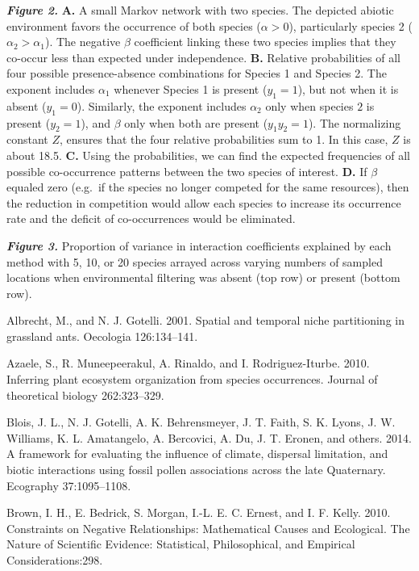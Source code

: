 \documentclass[12pt,]{article}
\begin{document}
\begin{spacing}{1.9}
\begin{flushleft}
\textbf{\emph{Figure 2.}} \textbf{A.} A small Markov network with two
species. The depicted abiotic environment favors the occurrence of both
species (\(\alpha >0\)), particularly species 2
(\(\alpha_2 > \alpha_1\)). The negative \(\beta\) coefficient linking
these two species implies that they co-occur less than expected under
independence. \textbf{B.} Relative probabilities of all four possible
presence-absence combinations for Species 1 and Species 2. The exponent
includes \(\alpha_1\) whenever Species 1 is present (\(y_1 = 1\)), but
not when it is absent (\(y_1 = 0\)). Similarly, the exponent includes
\(\alpha_2\) only when species \(2\) is present (\(y_2 = 1\)), and
\(\beta\) only when both are present (\(y_1y_2 = 1\)). The normalizing
constant \(Z\), ensures that the four relative probabilities sum to 1.
In this case, \(Z\) is about 18.5. \textbf{C.} Using the probabilities,
we can find the expected frequencies of all possible co-occurrence
patterns between the two species of interest. \textbf{D.} If \(\beta\)
equaled zero (e.g.~if the species no longer competed for the same
resources), then the reduction in competition would allow each species
to increase its occurrence rate and the deficit of co-occurrences would
be eliminated.

\textbf{\emph{Figure 3.}} Proportion of variance in interaction
coefficients explained by each method with 5, 10, or 20 species arrayed
across varying numbers of sampled locations when environmental filtering
was absent (top row) or present (bottom row).

Albrecht, M., and N. J. Gotelli. 2001. Spatial and temporal niche
partitioning in grassland ants. Oecologia 126:134--141.

Azaele, S., R. Muneepeerakul, A. Rinaldo, and I. Rodriguez-Iturbe. 2010.
Inferring plant ecosystem organization from species occurrences. Journal
of theoretical biology 262:323--329.

Blois, J. L., N. J. Gotelli, A. K. Behrensmeyer, J. T. Faith, S. K.
Lyons, J. W. Williams, K. L. Amatangelo, A. Bercovici, A. Du, J. T.
Eronen, and others. 2014. A framework for evaluating the influence of
climate, dispersal limitation, and biotic interactions using fossil
pollen associations across the late Quaternary. Ecography 37:1095--1108.

Brown, I. H., E. Bedrick, S. Morgan, I.-L. E. C. Ernest, and I. F.
Kelly. 2010. Constraints on Negative Relationships: Mathematical Causes
and Ecological. The Nature of Scientific Evidence: Statistical,
Philosophical, and Empirical Considerations:298.


\end{flushleft}
\end{spacing}
\end{document}

